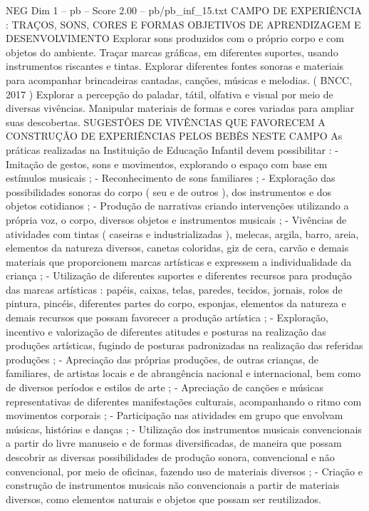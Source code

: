 \begin{textsample}{NEG Dim 1 – pb – Score 2.00 – pb/pb\_inf\_15.txt}  \label{ex:f1_neg_146}
CAMPO DE EXPERIÊNCIA : TRAÇOS, SONS, CORES E FORMAS OBJETIVOS DE APRENDIZAGEM E DESENVOLVIMENTO Explorar sons produzidos com o próprio corpo e com objetos do ambiente.
Traçar marcas gráficas, em diferentes suportes, usando instrumentos riscantes e tintas.
Explorar diferentes fontes sonoras e materiais para acompanhar brincadeiras cantadas, canções, músicas e melodias. ( BNCC, 2017 ) Explorar a percepção do paladar, tátil, olfativa e visual por meio de diversas vivências.
Manipular materiais de formas e cores variadas para ampliar suas descobertas.
SUGESTÕES DE VIVÊNCIAS QUE FAVORECEM A CONSTRUÇÃO DE EXPERIÊNCIAS PELOS BEBÊS NESTE CAMPO As práticas realizadas na Instituição de Educação Infantil devem possibilitar : - Imitação de gestos, sons e movimentos, explorando o espaço com base em estímulos musicais ; - Reconhecimento de sons familiares ; - Exploração das possibilidades sonoras do corpo ( seu e de outros ), dos instrumentos e dos objetos cotidianos ; - Produção de narrativas criando intervenções utilizando a própria voz, o corpo, diversos objetos e instrumentos musicais ; - Vivências de atividades com tintas ( caseiras e industrializadas ), melecas, argila, barro, areia, elementos da natureza diversos, canetas coloridas, giz de cera, carvão e demais materiais que proporcionem marcas artísticas e expressem a individualidade da criança ; - Utilização de diferentes suportes e diferentes recursos para produção das marcas artísticas : papéis, caixas, telas, paredes, tecidos, jornais, rolos de pintura, pincéis, diferentes partes do corpo, esponjas, elementos da natureza e demais recursos que possam favorecer a produção artística ; - Exploração, incentivo e valorização de diferentes atitudes e posturas na realização das produções artísticas, fugindo de posturas padronizadas na realização das referidas produções ; - Apreciação das próprias produções, de outras crianças, de familiares, de artistas locais e de abrangência nacional e internacional, bem como de diversos períodos e estilos de arte ; - Apreciação de canções e músicas representativas de diferentes manifestações culturais, acompanhando o ritmo com movimentos corporais ; - Participação nas atividades em grupo que envolvam músicas, histórias e danças ; - Utilização dos instrumentos musicais convencionais a partir do livre manuseio e de formas diversificadas, de maneira que possam descobrir as diversas possibilidades de produção sonora, convencional e não convencional, por meio de oficinas, fazendo uso de materiais diversos ; - Criação e construção de instrumentos musicais não convencionais a partir de materiais diversos, como elementos naturais e objetos que possam ser reutilizados.

\end{textsample}
